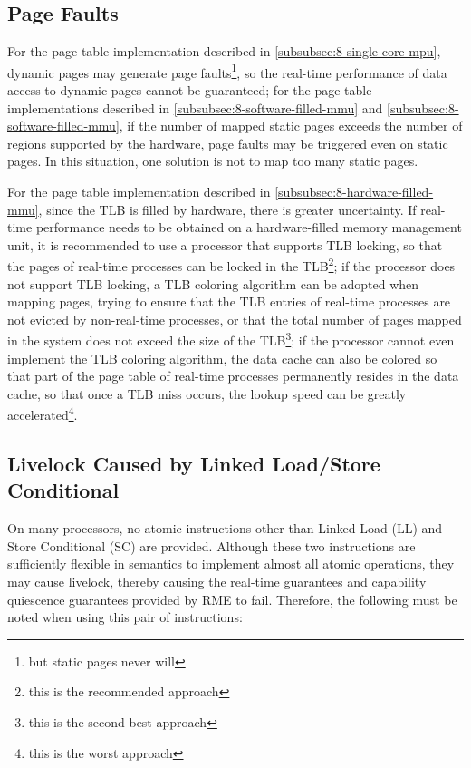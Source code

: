 \subsection{Page Faults}\label{subsec:9-page-faults}

For the page table implementation described in \ref{subsubsec:8-single-core-mpu}, dynamic pages may generate page faults\footnote{but static pages never will}, so the real-time performance of data access to dynamic pages cannot be guaranteed; for the page table implementations described in \ref{subsubsec:8-software-filled-mmu}
and \ref{subsubsec:8-software-filled-mmu}, if the number of mapped static pages exceeds the number of regions supported by the hardware, page faults may be triggered even on static pages. In this situation, one solution is not to map too many static pages.

For the page table implementation described in \ref{subsubsec:8-hardware-filled-mmu}, since the TLB is filled by hardware, there is greater uncertainty. If real-time performance needs to be obtained on a hardware-filled memory management unit, it is recommended to use a processor that supports TLB locking, so that the pages of real-time processes can be locked in the TLB\footnote{this is the recommended approach}; if the processor does not support TLB locking, a TLB coloring algorithm can be adopted when mapping pages, trying to ensure that the TLB entries of real-time processes are not evicted by non-real-time processes, or that the total number of pages mapped in the system does not exceed the size of the TLB\footnote{this is the second-best approach}; if the processor cannot even implement the TLB coloring algorithm, the data cache can also be colored so that part of the page table of real-time processes permanently resides in the data cache, so that once a TLB miss occurs, the lookup speed can be greatly accelerated\footnote{this is the worst approach}.

\subsection{Livelock Caused by Linked Load/Store Conditional}\label{subsec:9-ll-sc-livelock}

On many processors, no atomic instructions other than Linked Load (LL) and Store
Conditional (SC) are provided. Although these two instructions are sufficiently flexible in semantics to implement almost all atomic operations, they may cause livelock, thereby causing the real-time guarantees and capability quiescence guarantees provided by RME to fail. Therefore, the following must be noted when using this pair of instructions:

